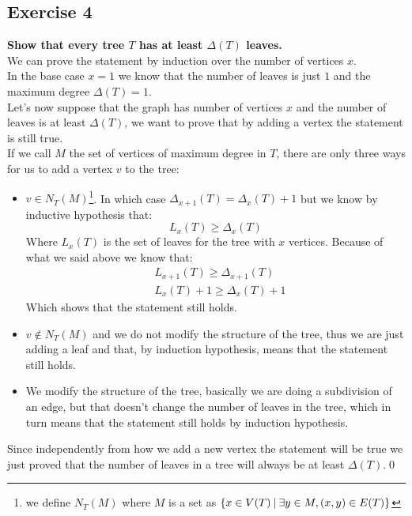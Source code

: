 \subsection*{Exercise 4}
\boldmath
\textbf{Show that every tree $T$ has at least $\Delta(T)$ leaves.}\\\linebreak
\unboldmath
We can prove the statement by induction over the number of vertices $x$.\\\linebreak
In the base case $x = 1$ we know that the number of leaves is just $1$ and the maximum degree $\Delta(T) = 1$.\\\linebreak
Let's now suppose that the graph has number of vertices $x$ and the number of leaves is at least $\Delta(T)$, we want to prove that by adding a vertex the statement is still true.\\\linebreak
If we call $M$ the set of vertices of maximum degree in $T$, there are only three ways for us to add a vertex $v$ to the tree:
\begin{itemize}
       \item $v \in N_T(M)$\footnote{we define $N_T(M)$ where $M$ is a set as $\{x \in V(T) \:|\: \exists y \in M, (x, y) \in E(T)\}$}. In which case $\Delta_{x + 1}(T) = \Delta_{x}(T) + 1$ but we know by inductive hypothesis that:
       \begin{equation*}
              L_x(T) \geq \Delta_x(T)
       \end{equation*}
       Where $L_x(T)$ is the set of leaves for the tree with $x$ vertices. Because of what we said above we know that:
       \begin{align*}
              &L_{x + 1}(T) \geq \Delta_{x + 1}(T) \\
              &L_x(T) + 1 \geq \Delta_x(T) + 1
       \end{align*}
       Which shows that the statement still holds.
       \item $v \notin N_T(M)$ and we do not modify the structure of the tree, thus we are just adding a leaf and that, by induction hypothesis, means that the statement still holds.
       \item We modify the structure of the tree, basically we are doing a subdivision of an edge, but that doesn't change the number of leaves in the tree, which in turn means that the statement still holds by induction hypothesis.
\end{itemize} 
Since independently from how we add a new vertex the statement will be true we just proved that the number of leaves in a tree will always be at least $\Delta(T)$.\qed